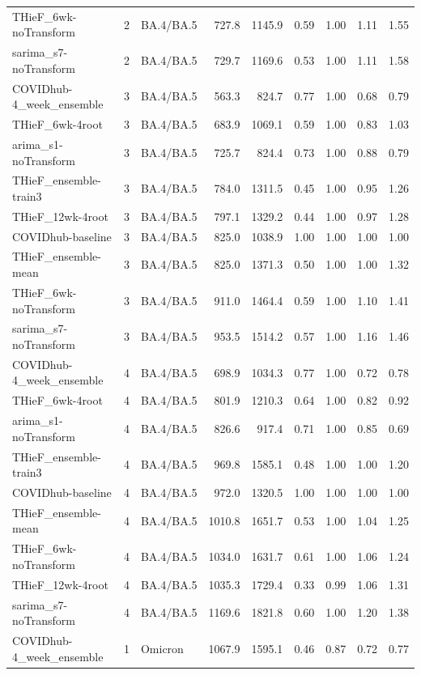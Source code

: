 \documentclass[thesis]{umassthesis}  %
\begin{document}
\begin{longtable}{lrlrrrrrr}
  THieF\_6wk-noTransform & 2 & BA.4/BA.5 & 727.8 & 1145.9 & 0.59 & 1.00 & 1.11 & 1.55 \\ 
  sarima\_s7-noTransform & 2 & BA.4/BA.5 & 729.7 & 1169.6 & 0.53 & 1.00 & 1.11 & 1.58 \\ 
  COVIDhub-4\_week\_ensemble & 3 & BA.4/BA.5 & 563.3 & 824.7 & 0.77 & 1.00 & 0.68 & 0.79 \\ 
  THieF\_6wk-4root & 3 & BA.4/BA.5 & 683.9 & 1069.1 & 0.59 & 1.00 & 0.83 & 1.03 \\ 
  arima\_s1-noTransform & 3 & BA.4/BA.5 & 725.7 & 824.4 & 0.73 & 1.00 & 0.88 & 0.79 \\ 
  THieF\_ensemble-train3 & 3 & BA.4/BA.5 & 784.0 & 1311.5 & 0.45 & 1.00 & 0.95 & 1.26 \\ 
  THieF\_12wk-4root & 3 & BA.4/BA.5 & 797.1 & 1329.2 & 0.44 & 1.00 & 0.97 & 1.28 \\ 
  COVIDhub-baseline & 3 & BA.4/BA.5 & 825.0 & 1038.9 & 1.00 & 1.00 & 1.00 & 1.00 \\ 
  THieF\_ensemble-mean & 3 & BA.4/BA.5 & 825.0 & 1371.3 & 0.50 & 1.00 & 1.00 & 1.32 \\ 
  THieF\_6wk-noTransform & 3 & BA.4/BA.5 & 911.0 & 1464.4 & 0.59 & 1.00 & 1.10 & 1.41 \\ 
  sarima\_s7-noTransform & 3 & BA.4/BA.5 & 953.5 & 1514.2 & 0.57 & 1.00 & 1.16 & 1.46 \\ 
  COVIDhub-4\_week\_ensemble & 4 & BA.4/BA.5 & 698.9 & 1034.3 & 0.77 & 1.00 & 0.72 & 0.78 \\ 
  THieF\_6wk-4root & 4 & BA.4/BA.5 & 801.9 & 1210.3 & 0.64 & 1.00 & 0.82 & 0.92 \\ 
  arima\_s1-noTransform & 4 & BA.4/BA.5 & 826.6 & 917.4 & 0.71 & 1.00 & 0.85 & 0.69 \\ 
  THieF\_ensemble-train3 & 4 & BA.4/BA.5 & 969.8 & 1585.1 & 0.48 & 1.00 & 1.00 & 1.20 \\ 
  COVIDhub-baseline & 4 & BA.4/BA.5 & 972.0 & 1320.5 & 1.00 & 1.00 & 1.00 & 1.00 \\ 
  THieF\_ensemble-mean & 4 & BA.4/BA.5 & 1010.8 & 1651.7 & 0.53 & 1.00 & 1.04 & 1.25 \\ 
  THieF\_6wk-noTransform & 4 & BA.4/BA.5 & 1034.0 & 1631.7 & 0.61 & 1.00 & 1.06 & 1.24 \\ 
  THieF\_12wk-4root & 4 & BA.4/BA.5 & 1035.3 & 1729.4 & 0.33 & 0.99 & 1.06 & 1.31 \\ 
  sarima\_s7-noTransform & 4 & BA.4/BA.5 & 1169.6 & 1821.8 & 0.60 & 1.00 & 1.20 & 1.38 \\ 
  COVIDhub-4\_week\_ensemble & 1 & Omicron & 1067.9 & 1595.1 & 0.46 & 0.87 & 0.72 & 0.77 \\ 

\end{longtable}
\end{document}

